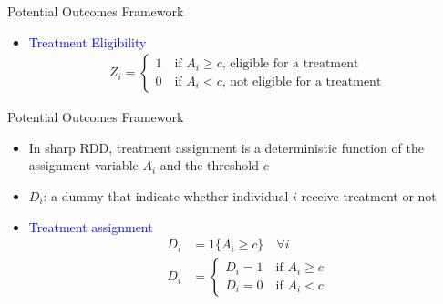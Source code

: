 \documentclass[hyperref={pdfpagelabels=false}]{beamer}
\begin{document}
\begin{frame}{Potential Outcomes Framework}{}
	\begin{itemize}
		
		\item \textcolor{blue}{Treatment Eligibility}
		\begin{align*}
			Z_{i}=\left\lbrace
			\begin{array}{l}
				1\quad \text{if $A_i\geq c$, eligible for a treatment}\\
				0\quad \text{if $A_i< c$, not eligible for a treatment}
			\end{array}\right.
		\end{align*}
		
	\end{itemize}
\end{frame}


\begin{frame}{Potential Outcomes Framework}{}
	
	\begin{itemize} 
		
		
		\item In sharp RDD, treatment assignment is a deterministic function of the assignment variable $A_{i}$ and the threshold $c$	
		\vspace{0.2cm}
		\item $D_i$: a dummy that indicate whether individual $i$ receive treatment or not
		\vspace{0.2cm}
		\item \textcolor{blue}{Treatment assignment}
		\begin{align*}
			D_i&=1\{A_i\geq c\} \quad \forall i \\  
			D_i&=\left\lbrace
			\begin{array}{l}
				D_i=1\quad \text{if $A_i\geq c$}\\
				D_i=0\quad \text{if $A_i<c$}
			\end{array}\right.
		\end{align*}
		
	\end{itemize}
\end{frame}
\end{document}
